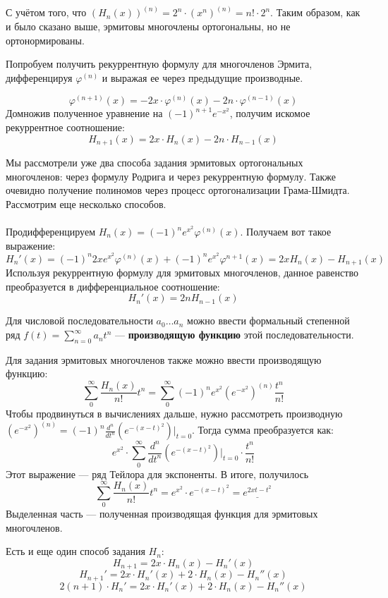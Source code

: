 \documentclass[12pt]{article}
\begin{document}
		С учётом того, что $(H_n(x))^{(n)} = 2^n \cdot (x^n)^{(n)} = n! \cdot 2^n$. Таким образом, как 
		и было сказано выше, эрмитовы многочлены ортогональны, но не ортонормированы.
	
		Попробуем получить рекуррентную формулу для многочленов Эрмита, дифференцируя $\varphi^{(n)}$ и выражая ее через предыдущие
		производные.
	
		$$ \varphi^{(n+1)}(x) = -2x \cdot \varphi^{(n)}(x) - 2n \cdot \varphi^{(n-1)}(x) $$
		Домножив полученное уравнение на $(-1)^{n+1} e^{-x^2}$, получим искомое рекуррентное соотношение:
		$$H_{n+1} (x) = 2x \cdot H_n(x) - 2n \cdot H_{n-1} (x)$$
	
		Мы рассмотрели уже два способа задания эрмитовых ортогональных многочленов: через формулу Родрига и через рекуррентную формулу.
		Также очевидно получение полиномов через процесс ортогонализации Грама-Шмидта. Рассмотрим еще несколько способов.\\ \\
	
		Продифференцируем $H_n(x) = (-1)^n e^{x^2} \varphi^{(n)}(x)$. Получаем вот такое выражение:
		$$H_n'(x) = (-1)^n 2x e^{x^2} \varphi^{(n)}(x) + (-1)^n e^{x^2} \varphi^{n+1}(x) = 2x H_n(x) - H_{n+1}(x)$$
		Используя рекуррентную формулу для эрмитовых многочленов, данное равенство преобразуется в дифференциальное соотношение:
		$$H_n'(x) = 2n H_{n-1}(x)$$
	
		\begin{defi}
		Для числовой последовательности $a_0 \dots a_n$ можно ввести формальный степенной ряд $f(t) = \sum_{n=0}^{\infty} a_n t^n$ 
		--- \textbf{производящую функцию} этой последовательности.
		\end{defi}
	
		Для задания эрмитовых многочленов также можно ввести производящую функцию:
		$$\sum_0^{\infty} \frac{H_n(x)}{n!} t^n = \sum_0^{\infty} (-1)^n e^{x^2} (e^{-x^2})^{(n)} \frac{t^n}{n!}$$
		Чтобы продвинуться в вычислениях дальше, нужно рассмотреть производную $(e^{-x^2})^{(n)} =
		(-1)^n \frac{d^n}{dt^n} (e^{-(x-t)^2}) |_{t=0}$. Тогда сумма преобразуется как:
		$$e^{x^2} \cdot \sum_0^{\infty} \frac{d^n}{dt^n} (e^{-(x-t)^2}) |_{t=0} \cdot \frac{t^n}{n!}$$
		Этот выражение --- ряд Тейлора для экспоненты. В итоге, получилось
		$$\sum_0^{\infty} \frac{H_n(x)}{n!} t^n = e^{x^2} \cdot e^{-(x-t)^2} = \underline{e^{2xt - t^2}}$$
		Выделенная часть --- полученная производящая функция для эрмитовых многочленов.
	
		Есть и еще один способ задания $H_n$:
		$$H_{n+1} = 2x \cdot H_n(x) - H_n'(x)$$
		$$H_{n+1}' = 2x \cdot H_n'(x) + 2 \cdot H_n(x) - H_n''(x)$$
		$$2(n+1) \cdot H_n' = 2x \cdot H_n'(x) + 2 \cdot H_n(x) - H_n''(x)$$
	
\end{document}
